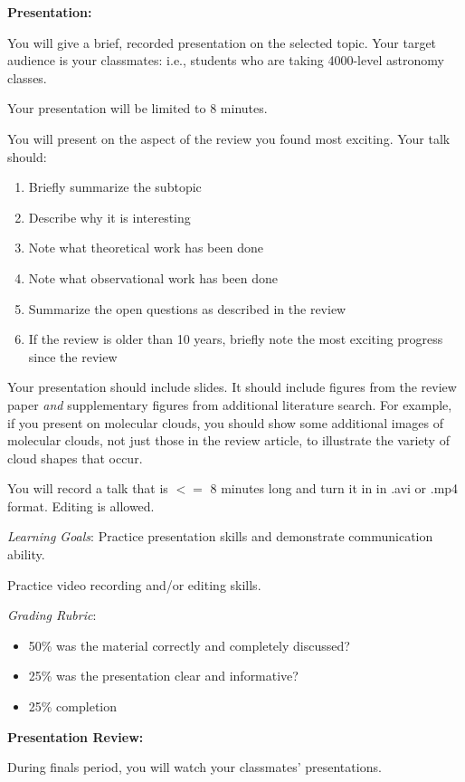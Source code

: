 \documentclass{article}
\begin{document}
\noindent \textbf{Presentation:}

You will give a brief, recorded presentation on the selected topic. 
Your target audience is your classmates: i.e., students who are taking 4000-level astronomy classes.

Your presentation will be limited to 8 minutes.

You will present on the aspect of the review you found most exciting.
Your talk should:

\begin{enumerate}
    \item Briefly summarize the subtopic
    \item Describe why it is interesting
    \item Note what theoretical work has been done
    \item Note what observational work has been done
    \item Summarize the open questions as described in the review
    \item If the review is older than 10 years, briefly note the
    most exciting progress since the review
\end{enumerate}

Your presentation should include slides.
It should include figures from the review paper \emph{and} supplementary figures
from additional literature search.
For example, if you present on molecular clouds, you should show some
additional images of molecular clouds, not just those in the review article, to
illustrate the variety of cloud shapes that occur.

You will record a talk that is $<=$ 8 minutes long and turn it in in .avi or .mp4
format.  Editing is allowed.

\textit{Learning Goals}:
    Practice presentation skills and demonstrate communication ability.

    Practice video recording and/or editing skills.

\textit{Grading Rubric}:
\begin{itemize}
    \item 50\% was the material correctly and completely discussed?
    \item 25\% was the presentation clear and informative?
    \item 25\% completion
\end{itemize}

\noindent \textbf{Presentation Review:}

During finals period, you will watch your classmates' presentations.
\end{document}
